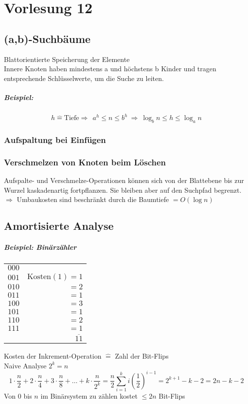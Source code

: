 \chapter{Vorlesung 12}
\section{(a,b)-Suchbäume}
Blattorientierte Speicherung der Elemente\\
Innere Knoten haben mindestens a und höchstens b Kinder und tragen entsprechende Schlüsselwerte, um die Suche zu leiten.
\paragraph{Beispiel:}%
\[h\hat{=}\text{Tiefe}\Rightarrow ~~ a^h\leq n \leq b^h ~\Rightarrow ~ \log_b n \leq h \leq \log_a n\]
\subsection{Aufspaltung bei Einfügen}
\subsection{Verschmelzen von Knoten beim Löschen}
Aufspalte- und Verschmelze-Operationen können sich von der Blattebene bis zur Wurzel kaskadenartig fortpflanzen. Sie bleiben aber auf den Suchpfad begrenzt.\\
$\Rightarrow$ Umbaukosten sind beschränkt durch die Baumtiefe $=O(\log n)$
\section{Amortisierte Analyse}
\paragraph{Beispiel: Binärzähler}
	\begin{tabular}{lr}
		$000$& \\
		$001$&$\text{Kosten}(1)=1$\\
		$010$&$=2$\\
		$011$&$=1$\\
		$100$&$=3$\\
		$101$&$=1$\\
		$110$&$=2$\\
		$111$&$=1$\\
		 &$\overline{11}$
	\end{tabular}
	Kosten der Inkrement-Operation $\hat{=}$ Zahl der Bit-Flips\\
	Naive Analyse $2^k=n$
	\[1\cdot\frac{n}{2}+2\cdot\frac{n}{4}+3\cdot\frac{n}{8}+\ldots+k\cdot\frac{n}{2^k}=\frac{n}{2}\sum_{i=1}^{k}i(\frac{1}{2})^{i-1}=2^{k+1}-k-2=2n-k-2 \]
Von $0$ bis $n$ im Binärsystem zu zählen kostet  $\leq 2n$ Bit-Flips
